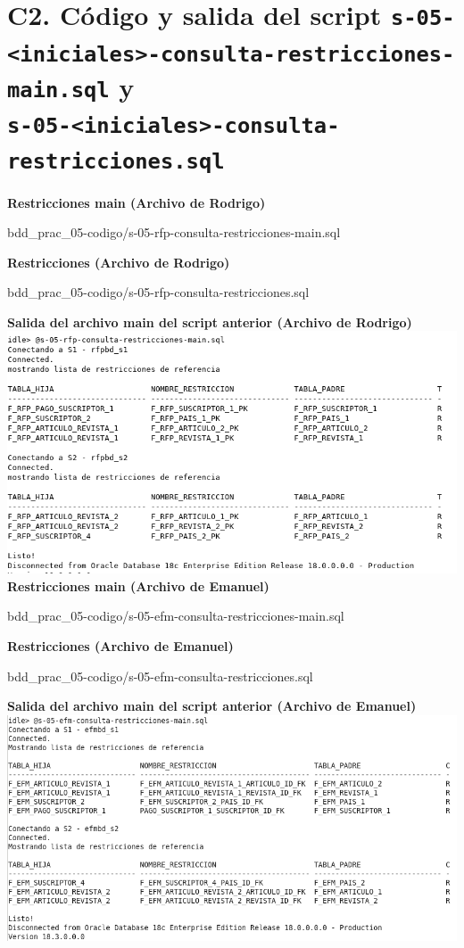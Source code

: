 \documentclass{article}
\begin{document}
\section*{C2. Código y salida del script 
\texttt{s-05-<iniciales>-consulta-restricciones-main.sql} y\\
\texttt{s-05-<iniciales>-consulta-restricciones.sql}}

\textbf{Restricciones main (Archivo de Rodrigo)}


{bdd_prac_05-codigo/s-05-rfp-consulta-restricciones-main.sql}

\textbf{Restricciones (Archivo de Rodrigo)}


{bdd_prac_05-codigo/s-05-rfp-consulta-restricciones.sql}

\textbf{Salida del archivo main del script anterior (Archivo de Rodrigo)}\\
\includegraphics[width=0.8\linewidth]{bdd_prac05-c2-restricciones}\\

\textbf{Restricciones main (Archivo de Emanuel)}

{bdd_prac_05-codigo/s-05-efm-consulta-restricciones-main.sql}

\textbf{Restricciones (Archivo de Emanuel)}

{bdd_prac_05-codigo/s-05-efm-consulta-restricciones.sql}

\textbf{Salida del archivo main del script anterior (Archivo de Emanuel)}\\
\includegraphics[width=0.8\linewidth]{bdd-p5-efm-c2}
\end{document}
